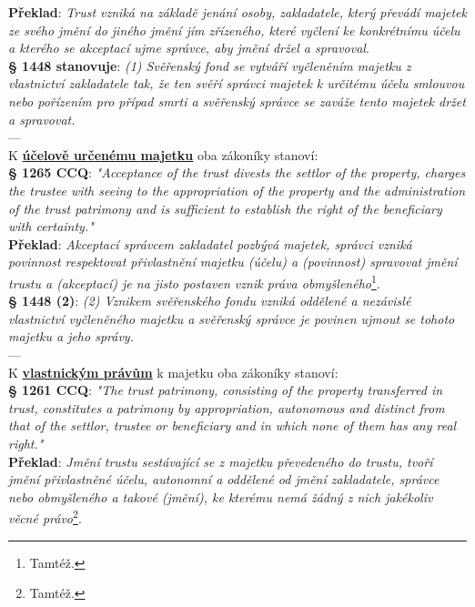 \documentclass{article}
\begin{document}
\textbf{Překlad}: \textit{Trust vzniká na základě jenání osoby, zakladatele, který převádí majetek ze svého jmění do jiného jmění jím zřízeného, které vyčlení ke konkrétnímu účelu a kterého se akceptací ujme správce, aby jmění držel a spravoval}.\\

\textbf{§ 1448 stanovuje}:
\textit{(1) Svěřenský fond se vytváří vyčleněním majetku z vlastnictví zakladatele tak, že ten svěří správci majetek k určitému účelu smlouvou nebo pořízením pro případ smrti a svěřenský správce se zaváže tento majetek držet a spravovat.}\\

---\\

K \textbf{\underline{účelově určenému majetku}} oba zákoníky stanoví:\\

\textbf{§ 1265 CCQ}: \textit{"Acceptance of the trust divests the settlor of the property, charges the trustee with seeing to the appropriation of the property and the administration of the trust patrimony and is sufficient to establish the right of the beneficiary with certainty."}\\

\textbf{Překlad}: \textit{Akceptací správcem zakladatel pozbývá majetek, správci vzniká povinnost respektovat přivlastnění majetku (účelu) a (povinnost) spravovat jmění trustu a (akceptací) je na jisto postaven vznik práva obmyšleného}\footnote{Tamtéž.}.\\

\textbf{§ 1448 (2)}:
\textit{(2) Vznikem svěřenského fondu vzniká oddělené a nezávislé vlastnictví vyčleněného majetku a svěřenský správce je povinen ujmout se tohoto majetku a jeho správy.}\\

---\\

K \textbf{\underline{vlastnickým právům}} k majetku oba zákoníky stanoví:\\

\textbf{§ 1261 CCQ}: \textit{"The trust patrimony, consisting of the property transferred in trust, constitutes a patrimony by appropriation, autonomous and distinct from that of the settlor, trustee or beneficiary and in which none of them has any real right."}\\

\textbf{Překlad}: \textit{Jmění trustu sestávající se z majetku převedeného do trustu, tvoří jmění přivlastněné účelu, autonomní a oddělené od jmění zakladatele, správce nebo obmyšleného a takové (jmění), ke kterému nemá žádný z nich jakékoliv věcné právo}\footnote{Tamtéž.}.\\
\end{document}
